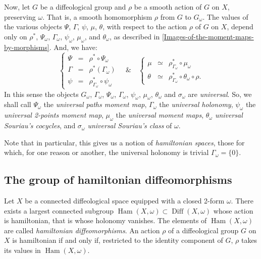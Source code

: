 \documentclass[10pt,reqno,twoside]{amsart}
\DeclareMathOperator{\Diff}{Diff}
\DeclareMathOperator{\Ham}{Ham}
\theoremstyle{plain}
\theoremstyle{definition}
\newcommand{\article}[1]{\subsection{#1}}
\begin{document}
  Now,
  let $G$ be a diffeological group and $\rho$ be a smooth action of $G$ on $X$,
  preserving $\omega$.
  That is,
  a smooth homomorphism $\rho$ from $G$ to $G_\omega$.
  The values of the various objects $\Psi$, $\Gamma$, $\psi$, $\mu$, $\theta$,
  with respect to the action $\rho$ of $G$ on $X$,
  depend only on $\rho^*$, $\Psi_\omega$, $\Gamma_\omega$, $\psi_\omega$, $\mu_\omega$, and $\theta_\omega$,
  as described in \ref{Images-of-the-moment-maps-by-morphisms}.
  And,
  we have:
  $$
    \left\{
    \begin{array}{rcl}
    \Psi & = & \rho^* \circ \Psi_\omega \\
    \Gamma & = & \rho^*(\Gamma_\omega) \\
    \psi & = & \rho_{\Gamma_\omega}^* \circ \psi_\omega
    \end{array}
    \right.
    \quad \& \quad
    \left\{
    \begin{array}{rcl}
    \mu & \simeq & \rho_{\Gamma_\omega}^* \circ \mu_\omega \\
    \theta & \simeq & \rho_{\Gamma_\omega}^* \circ
    \theta_\omega \circ \rho.
    \end{array}
    \right.
    $$
  In this sense the objects $G_\omega$, $\Gamma_\omega$, $\Psi_\omega$, $\Gamma_\omega$, $\psi_\omega$, $\mu_\omega$, $\theta_\omega$ and $\sigma_\omega$ are {\em universal}.
  So,
  we shall call $\Psi_\omega$ the {\em universal paths moment map},
  $\Gamma_\omega$ the {\em universal holonomy},
  $\psi_\omega$ the {\em universal 2-points moment map},
  $\mu_\omega$ the {\em universal moment maps},
  $\theta_\omega$ {\em universal Souriau's cocycles},
  and $\sigma_\omega$ {\em universal Souriau's class} of $\omega$.
  
  Note that in particular,
  this gives us a notion of {\em hamiltonian spaces},
  those for which,
  for one reason or another,
  the universal holonomy is trivial $\Gamma_\omega = \{0\}$.
  
  \article{The group of hamiltonian diffeomorphisms}
  \label{The-group-of-hamiltonian-diffeomorphisms}
  Let $X$ be a connected diffeological space equipped with a closed 2-form $\omega$.
  There exists a largest connected subgroup $\Ham(X,\omega) \subset \Diff(X,\omega)$ whose action is hamiltonian,
  that is whose holonomy vanishes.
  The elements of $\Ham(X,\omega)$ are called {\em hamiltonian diffeomorphisms\/}.
  An action $\rho$ of a diffeological group $G$ on $X$ is hamiltonian if and only if,
  restricted to the identity component of $G$,
  $\rho$ takes its values in $\Ham(X,\omega)$.
  
\end{document}
